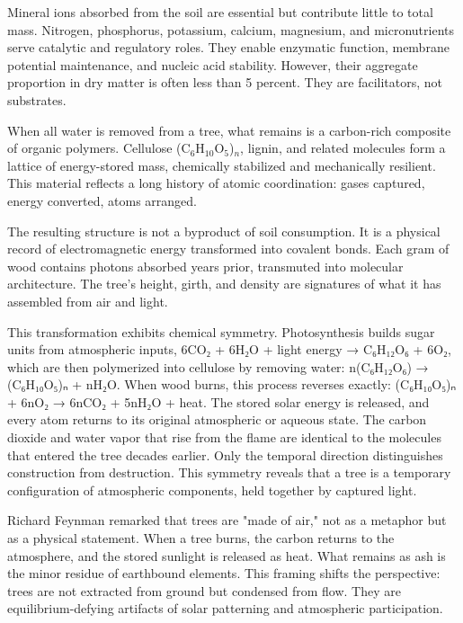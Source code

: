 Mineral ions absorbed from the soil are essential but contribute little to total mass. Nitrogen, phosphorus, potassium, calcium, magnesium, and micronutrients serve catalytic and regulatory roles. They enable enzymatic function, membrane potential maintenance, and nucleic acid stability. However, their aggregate proportion in dry matter is often less than 5 percent. They are facilitators, not substrates.

When all water is removed from a tree, what remains is a carbon-rich composite of organic polymers. Cellulose (C\(_6\)H\(_{10}\)O\(_5\))\(_n\), lignin, and related molecules form a lattice of energy-stored mass, chemically stabilized and mechanically resilient. This material reflects a long history of atomic coordination: gases captured, energy converted, atoms arranged.

The resulting structure is not a byproduct of soil consumption. It is a physical record of electromagnetic energy transformed into covalent bonds. Each gram of wood contains photons absorbed years prior, transmuted into molecular architecture. The tree's height, girth, and density are signatures of what it has assembled from air and light.

This transformation exhibits chemical symmetry. Photosynthesis builds sugar units from atmospheric inputs, 6CO₂ + 6H₂O + light energy → C₆H₁₂O₆ + 6O₂, which are then polymerized into cellulose by removing water: n(C₆H₁₂O₆) → (C₆H₁₀O₅)ₙ + nH₂O. When wood burns, this process reverses exactly: (C₆H₁₀O₅)ₙ + 6nO₂ → 6nCO₂ + 5nH₂O + heat. The stored solar energy is released, and every atom returns to its original atmospheric or aqueous state. The carbon dioxide and water vapor that rise from the flame are identical to the molecules that entered the tree decades earlier. Only the temporal direction distinguishes construction from destruction. This symmetry reveals that a tree is a temporary configuration of atmospheric components, held together by captured light.

Richard Feynman remarked that trees are "made of air," not as a metaphor but as a physical statement. When a tree burns, the carbon returns to the atmosphere, and the stored sunlight is released as heat. What remains as ash is the minor residue of earthbound elements. This framing shifts the perspective: trees are not extracted from ground but condensed from flow. They are equilibrium-defying artifacts of solar patterning and atmospheric participation.

